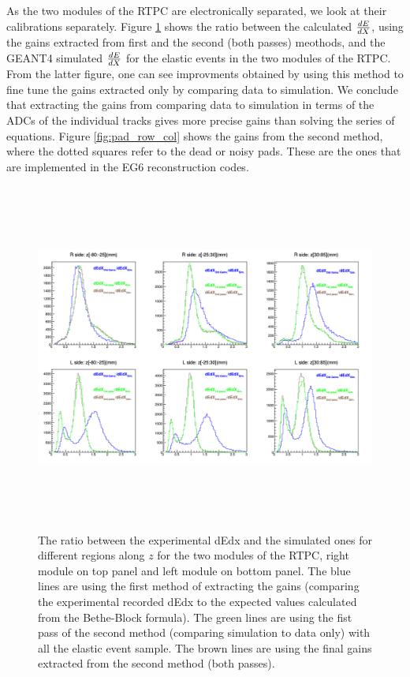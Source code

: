 As the two modules of the RTPC are electronically separated, we look at their 
calibrations separately. Figure \ref{fig:dedxre} shows the ratio between the 
calculated $\small{\frac{dE}{dX}}$, using the gains extracted from first and 
the second (both passes) meothods, and the GEANT4 simulated 
$\small{\frac{dE}{dX}}$ for the elastic events in the two modules of the RTPC.  
From the latter figure, one can see improvments obtained by using this method 
to fine tune the gains extracted only by comparing data to simulation. We 
conclude that extracting the gains from comparing data to simulation in terms 
of the ADCs of the individual tracks gives more precise gains than solving the 
series of equations. Figure \ref{fig:pad_row_col} shows the gains from the 
second method, where the dotted squares refer to the dead or noisy pads. These 
are the ones that are implemented in the EG6 reconstruction codes.


\begin{figure}[tpb]
\hspace{-0.5 cm}
\includegraphics[height=11.5cm]{fig_rtpc/updates/dedx_ratio_elastic_NAB.png}
\caption{The ratio between the experimental dEdx and the simulated ones for 
   different regions along $z$ for the two modules of the RTPC, right module on 
   top panel and left module on bottom panel. The blue lines are using the 
   first method of extracting the gains (comparing the experimental recorded 
   dEdx to the expected values calculated from the Bethe-Block formula). The 
green lines are using the fist pass of the second method (comparing simulation 
to data only) with all the elastic event sample. The brown lines are using the 
final gains extracted from the second method (both passes).}
\label{fig:dedxre}
\end{figure}


